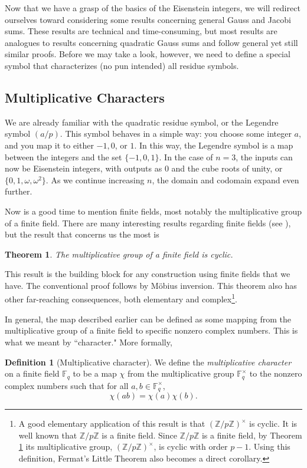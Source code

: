 \documentclass[10pt]{amsart}
\newcommand{\ZZ}{\mathbb{Z}}
\theoremstyle{plain}
\newtheorem{thm}{Theorem}
\theoremstyle{definition}
\newtheorem{defn}{Definition}
\theoremstyle{remark}
\numberwithin{equation}{section}
\begin{document}
\indent Now that we have a grasp of the basics of the Eisenstein integers, we will redirect ourselves toward considering some results concerning general Gauss and Jacobi sums. These results are technical and time-consuming, but most results are analogues to results concerning quadratic Gauss sums and follow general yet still similar proofs. Before we may take a look, however, we need to define a special symbol that characterizes (no pun intended) all residue symbols. 

\subsection*{Multiplicative Characters}
We are already familiar with the quadratic residue symbol, or the Legendre symbol $(a/p)$. This symbol behaves in a simple way: you choose some integer $a$, and you map it to either $-1,0$, or $1$. In this way, the Legendre symbol is a map between the integers and the set $\{ -1,0,1 \}$. In the case of $n=3$, the inputs can now be Eisenstein integers, with outputs as $0$ and the cube roots of unity, or $\{ 0,1,\omega,\omega^{2} \}$. As we continue increasing $n$, the domain and codomain expand even further. 

Now is a good time to mention finite fields, most notably the multiplicative group of a finite field. There are many interesting results regarding finite fields (see \cite{relyea2024finitefieldshigherreciprocity}), but the result that concerns us the most is 


\begin{thm} \label{Theorem: the multiplicative group of a finite field is cyclic}
    The multiplicative group of a finite field is cyclic.
\end{thm}
This result is the building block for any construction using finite fields that we have. The conventional proof follows by Möbius inversion. This theorem also has other far-reaching consequences, both elementary and complex\footnote{A good elementary application of this result is that $(\ZZ/p\ZZ)^{\times}$ is cyclic. It is well known that $\ZZ/p\ZZ$ is a finite field. Since $\ZZ/p\ZZ$ is a finite field, by Theorem \ref{Theorem: the multiplicative group of a finite field is cyclic} its multiplicative group, $(\ZZ/p\ZZ)^{\times}$, is cyclic with order $p-1$. Using this definition, Fermat's Little Theorem also becomes a direct corollary.\label{Footnote: mult group of int mod p is cyclic}}.


In general, the map described earlier can be defined as some mapping from the multiplicative group of a finite field to specific nonzero complex numbers. This is what we meant by ``character." More formally,
\begin{defn}[Multiplicative character]
    We define the \textit{multiplicative character} on a finite field $\mathbb{F}_{q}$ to be a map $\chi$ from the multiplicative group $\mathbb{F}_{q}^{\times}$ to the nonzero complex numbers such that for all $a,b\in \mathbb{F}_{q}^{\times}$,
    \begin{equation*}
        \chi(ab)=\chi(a)\chi(b).
    \end{equation*}
\end{defn}
\end{document}
